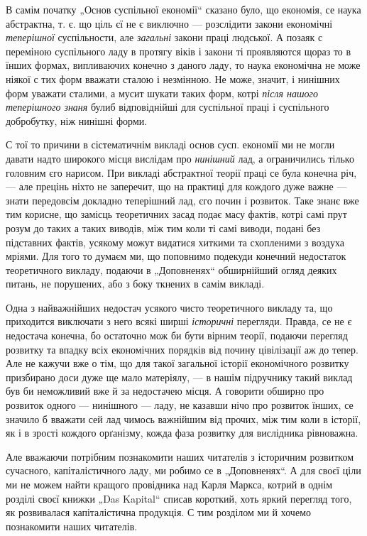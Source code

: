 \noindent{}В самім початку „Основ суспільної економії“ сказано було, що економія, се наука абстрактна, т. є. що ціль єї не є виключно — розслідити закони економічні \emph{теперішної} суспільности, але \emph{загальні} закони праці людської. А позаяк с переміною суспільного ладу в протягу віків і закони ті проявляются щораз то в їнших формах, випливаючих конечно з даного ладу, то наука економічна не може ніякої с тих форм вважати сталою і незмінною. Не може, значит, і нинішних форм уважати сталими, а мусит шукати таких форм, котрі \emph{після нашого теперішного знаня} булиб відповіднійші для суспільної праці і суспільного добробутку, ніж нинішні форми.

С тої то причини в сістематичнім викладі основ сусп. економії ми не могли давати надто широкого місця вислідам про \emph{нинішний} лад, а ограничились тілько головним єго нарисом. При викладі абстрактної теорії праці се була конечна річ, — але прецінь ніхто не заперечит, що на практиці для кождого дуже важне — знати передовсім докладно теперішний лад, єго почин і розвиток. Таке знанє вже тим корисне, що замісць теоретичних засад подає масу фактів, котрі самі прут розум до таких а таких виводів, між тим коли ті самі виводи, подані без підставних фактів, усякому можут видатися хиткими та схопленими з воздуха мріями. Для того то думаєм ми, що поповнимо подекуди конечний недостаток теоретичного викладу, подаючи в „Доповненях“ обширнійший огляд деяких питань, не порушених, або з боку ткнених в самім викладі.

Одна з найважнійших недостач усякого чисто теоретичного викладу та, що приходится виключати з него всякі ширші \emph{історичні} перегляди. Правда, се не є недостача конечна, бо остаточно мож би бути вірним теорії, подаючи перегляд розвитку та впадку всіх економічних порядків від почину цівілізації аж до тепер. Але не кажучи вже о тім, що для такої загальної історії економічного розвитку призбирано доси дуже ще мало матеріялу, — в нашім підручнику такий виклад був би неможливий вже й за недостачею місця. А говорити обширно про розвиток одного — нинішного — ладу, не казавши нічо про розвиток їнших, се значило б вважати сей лад чимось важнійшим від прочих, між тим коли в історії, як і в зрості кождого орґанізму, кожда фаза розвитку для вислідника рівноважна.

Але вважаючи потрібним познакомити наших читателів з історичним розвитком сучасного, капіталістичного ладу, ми робимо се в „Доповненях“. А для своєї ціли ми не можем найти кращого провідника над Карля Маркса, котрий в однім розділі своєї книжки „Das Kapital“ списав короткий, хоть яркий перегляд того, як розвивалася капіталістична продукція. С тим розділом ми й хочемо познакомити наших читателів.


